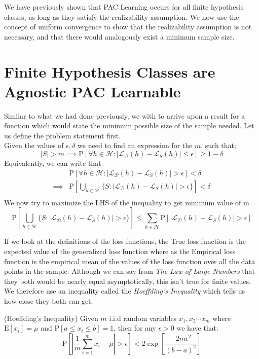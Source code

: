 \documentclass[11pt,oneside,onemany]{book} %
\begin{document}
We have previously shown that PAC Learning occurs for all finite hypothesis classes, as long as they satisfy the realizability assumption. We now use the concept of uniform convergence to show that the realizability assumption is not necessary, and that there would analogously exist a minimum sample size.

\section{Finite Hypothesis Classes are Agnostic PAC Learnable}
\label{agn-PAC-finite}

Similar to what we had done previously, we with to arrive upon a result for a function which would state the minimum possible size of the sample needed. Let us define the problem statement first.\\

Given the values of $\epsilon, \delta$ we need to find an expression for the $m$, such that;
$$|S|>m \implies \text{P}\left[\forall h\in\mathcal{H}: |\mathcal{L}_\mathcal{D}(h) - \mathcal{L}_S(h) | \leq \epsilon\right] \geq 1-\delta$$
Equivalently, we can write that
\begin{align*}
    & \text{P}\left[\forall h\in\mathcal{H}:| \mathcal{L}_\mathcal{D}(h) - \mathcal{L}_S(h) | > \epsilon\right] < \delta \\
    \implies & \text{P}\left[\bigcup\limits_{h\in\mathcal{H}}\{S:| \mathcal{L}_\mathcal{D}(h) - \mathcal{L}_S(h) | > \epsilon\}\right] < \delta \\
\end{align*}
We now try to maximize the LHS of the inequality to get minimum value of m.
$$
    \text{P}\left[\bigcup\limits_{h\in\mathcal{H}}\{S:| \mathcal{L}_\mathcal{D}(h) - \mathcal{L}_S(h) | > \epsilon\}\right] \leq 
    \sum_{h\in\mathcal{H}}\text{P}\left[ |\mathcal{L}_\mathcal{D}(h)-\mathcal{L}_S(h)| > \epsilon \right]
$$

If we look at the definitions of the loss functions, the True loss function is the expected value of the generalized loss function where as the Empirical loss function is the empirical mean of the values of the loss function over all the data points in the sample. Although we can say from \emph{The Law of Large Numbers} that they both would be nearly equal asymptotically, this isn't true for finite values. We therefore use an inequality called the \emph{Hoeffding’s Inequality} which tells us how close they both can get.

\begin{theorem}
(Hoeffding's Inequality) Given $m$ i.i.d random variables $x_1,x_2\cdots x_m$ where $\text{E}[x_i]=\mu$ and $\text{P}[a\leq x_i\leq b]=1$, then for any $\epsilon>0$ we have that:
$$
    \text{P}\left[ \left| \frac{1}{m}\sum_{i=1}^mx_i - \mu \right| > \epsilon \right] < 2\exp\left[ \frac{-2m\epsilon^2}{(b-a)^2} \right]
$$
\end{theorem}
\end{document}
